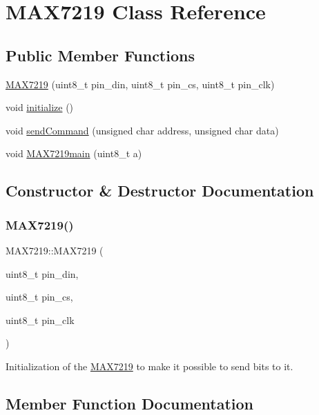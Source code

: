 \hypertarget{class_m_a_x7219}{}\section{M\+A\+X7219 Class Reference}
\label{class_m_a_x7219}
\subsection*{Public Member Functions}
\begin{DoxyCompactItemize}
\item 
\mbox{\hyperlink{class_m_a_x7219_a72b9b9a3a8d404724f767752369e3a72}{M\+A\+X7219}} (uint8\+\_\+t pin\+\_\+din, uint8\+\_\+t pin\+\_\+cs, uint8\+\_\+t pin\+\_\+clk)
\item 
void \mbox{\hyperlink{class_m_a_x7219_a63ae4075a29a72a2b2433af9dc4b0af0}{initialize}} ()
\item 
void \mbox{\hyperlink{class_m_a_x7219_a9006fd3f33c2354edbb856f564b4d9e7}{send\+Command}} (unsigned char address, unsigned char data)
\item 
void \mbox{\hyperlink{class_m_a_x7219_a08d465502f884573bed22af5add2dcb0}{M\+A\+X7219main}} (uint8\+\_\+t a)
\end{DoxyCompactItemize}


\subsection{Constructor \& Destructor Documentation}
\mbox{\label{class_m_a_x7219_a72b9b9a3a8d404724f767752369e3a72}} 
\subsubsection{\texorpdfstring{MAX7219()}{MAX7219()}}
{\footnotesize\ttfamily M\+A\+X7219\+::\+M\+A\+X7219 (\begin{DoxyParamCaption}\item[{uint8\+\_\+t}]{pin\+\_\+din,  }\item[{uint8\+\_\+t}]{pin\+\_\+cs,  }\item[{uint8\+\_\+t}]{pin\+\_\+clk }\end{DoxyParamCaption})}

Initialization of the \mbox{\hyperlink{class_m_a_x7219}{M\+A\+X7219}} to make it possible to send bits to it. 

\subsection{Member Function Documentation}
\mbox{\label{class_m_a_x7219_a63ae4075a29a72a2b2433af9dc4b0af0}} 
